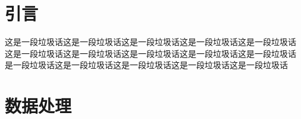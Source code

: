 \documentclass[UTF8]{ctexart}
\begin{document}
\clearpage
\makecover

\pagebreak

\tableofcontents

\pagebreak

\section{引言}

这是一段垃圾话这是一段垃圾话这是一段垃圾话这是一段垃圾话这是一段垃圾话
这是一段垃圾话这是一段垃圾话这是一段垃圾话这是一段垃圾话这是一段垃圾话
是一段垃圾话这是一段垃圾话这是一段垃圾话这是一段垃圾话这是一段垃圾话

\pagebreak

\section{数据处理}
\end{document}
